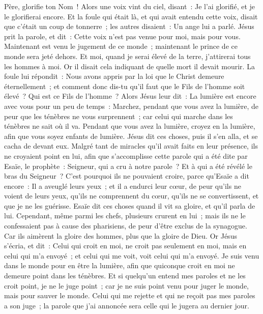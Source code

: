 \begin{multicols}{2}
Père, glorifie ton Nom~! Alors une voix vint du ciel, disant~: Je l'ai glorifié, et je le glorifierai encore.
Et la foule qui était là, et qui avait entendu cette voix, disait que c'était un coup de tonnerre~; les autres disaient~: Un ange lui a parlé.
Jésus prit la parole, et dit~: Cette voix n'est pas venue pour moi, mais pour vous.
Maintenant est venu le jugement de ce monde~; maintenant le prince de ce monde sera jeté dehors.
Et moi, quand je serai élevé de la terre, j'attirerai tous les hommes à moi.
Or il disait cela indiquant de quelle mort il devait mourir.
La foule lui répondit~: Nous avons appris par la loi que le Christ demeure éternellement~; et comment donc dis-tu qu'il faut que le Fils de l'homme soit élevé~? Qui est ce Fils de l'homme~?
Alors Jésus leur dit~: La lumière est encore avec vous pour un peu de temps~: Marchez, pendant que vous avez la lumière, de peur que les ténèbres ne vous surprennent~; car celui qui marche dans les ténèbres ne sait où il va.
Pendant que vous avez la lumière, croyez en la lumière, afin que vous soyez enfants de lumière. Jésus dit ces choses, puis il s'en alla, et se cacha de devant eux.
Malgré tant de miracles qu'il avait faits en leur présence, ils ne croyaient point en lui,
afin que s'accomplisse cette parole qui a été dite par Esaïe, le prophète~: Seigneur, qui a cru à notre parole~? Et à qui a été révélé le bras du Seigneur~?
C'est pourquoi ils ne pouvaient croire, parce qu'Esaïe a dit encore~:
Il a aveuglé leurs yeux~; et il a endurci leur cœur, de peur qu'ils ne voient de leurs yeux, qu'ils ne comprennent du cœur, qu'ils ne se convertissent, et que je ne les guérisse.
Esaïe dit ces choses quand il vit sa gloire, et qu'il parla de lui.
Cependant, même parmi les chefs, plusieurs crurent en lui~; mais ils ne le confessaient pas à cause des pharisiens, de peur d'être exclus de la synagogue.
Car ils aimèrent la gloire des hommes, plus que la gloire de Dieu.
Or Jésus s'écria, et dit~: Celui qui croit en moi, ne croit pas seulement en moi, mais en celui qui m'a envoyé~;
et celui qui me voit, voit celui qui m'a envoyé.
Je suis venu dans le monde pour en être la lumière, afin que quiconque croit en moi ne demeure point dans les ténèbres.
Et si quelqu'un entend mes paroles et ne les croit point, je ne le juge point~; car je ne suis point venu pour juger le monde, mais pour sauver le monde.
Celui qui me rejette et qui ne reçoit pas mes paroles a son juge~; la parole que j'ai annoncée sera celle qui le jugera au dernier jour.

\end{multicols}

